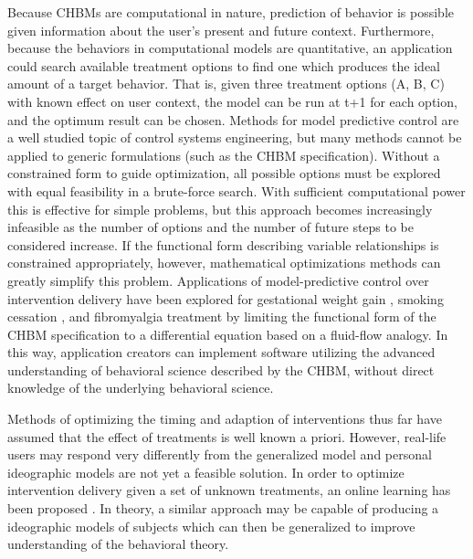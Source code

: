 \documentclass[runningheads,a4paper]{llncs}
\begin{document}
Because CHBMs are computational in nature, prediction of behavior is possible given information about the user's present and future context.
Furthermore, because the behaviors in computational models are quantitative, an application could search available treatment options to find one which produces the ideal amount of a target behavior.
That is, given three treatment options (A, B, C) with known effect on user context, the model can be run at t+1 for each option, and the optimum result can be chosen.
Methods for model predictive control are a well studied topic of control systems engineering, but many methods cannot be applied to generic formulations (such as the CHBM specification).
Without a constrained form to guide optimization, all possible options must be explored with equal feasibility in a brute-force search.
With sufficient computational power this is effective for simple problems, but this approach becomes increasingly infeasible as the number of options and the number of future steps to be considered increase.
If the functional form describing variable relationships is constrained appropriately, however, mathematical optimizations methods can greatly simplify this problem.
Applications of model-predictive control over intervention delivery have been explored for gestational weight gain \cite{dong2013hybrid}, smoking cessation \cite{timms2014hybrid}, and fibromyalgia treatment \cite{deshpande2014optimized} by limiting the functional form of the CHBM specification to a differential equation based on a fluid-flow analogy.
In this way, application creators can implement software utilizing the advanced understanding of behavioral science described by the CHBM, without direct knowledge of the underlying behavioral science.

Methods of optimizing the timing and adaption of interventions thus far have assumed that the effect of treatments is well known a priori.
However, real-life users may respond very differently from the generalized model and personal ideographic models are not yet a feasible solution.
In order to optimize intervention delivery given a set of unknown treatments, an online learning has been proposed \cite{jaimes2015calma}.
In theory, a similar approach may be capable of producing a ideographic models of subjects which can then be generalized to improve understanding of the behavioral theory.
\end{document}
